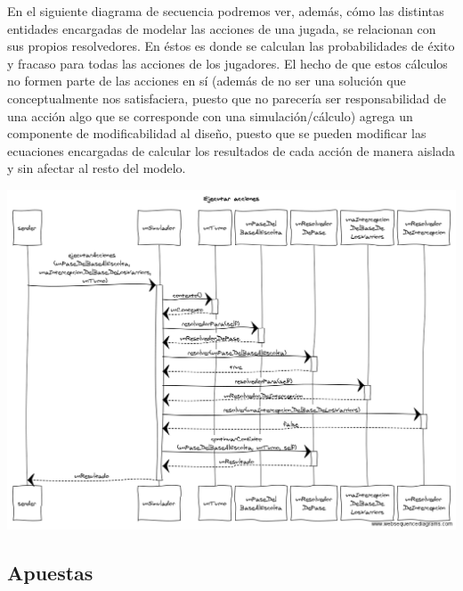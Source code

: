 En el siguiente diagrama de secuencia podremos ver, además, cómo las distintas entidades encargadas de modelar las acciones de una jugada, se relacionan con sus propios resolvedores. En éstos es donde se calculan las probabilidades de éxito y fracaso para todas las acciones de los jugadores. El hecho de que estos cálculos no formen parte de las acciones en sí (además de no ser una solución que conceptualmente nos satisfaciera, puesto que no parecería ser responsabilidad de una acción algo que se corresponde con una simulación/cálculo) agrega un componente de modificabilidad al diseño, puesto que se pueden modificar las ecuaciones encargadas de calcular los resultados de cada acción de manera aislada y sin afectar al resto del modelo.

\begin{center}
\includegraphics[scale=0.4, angle=90]{diseno/Ejecutar_acciones.png}
\end{center}


\subsection{Apuestas}

